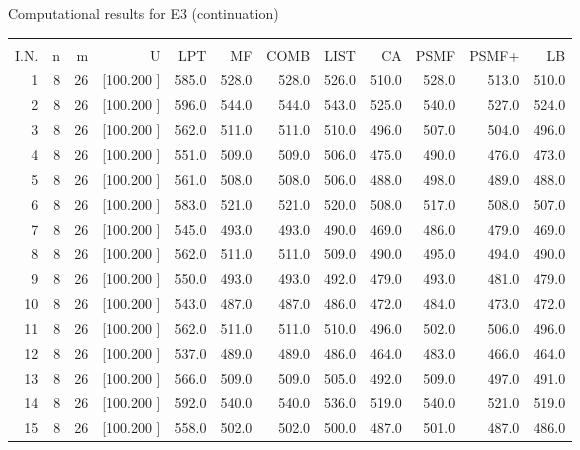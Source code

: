 \documentclass[12pt,a4paper]{article}
\begin{document}
\newpage
\begin{center}
 Computational results for E3 (continuation) {\tiny
\begin{tabular}{r r r r r r r r r r r r}\hline
    &   &   &          &        &        &        &        &        &        &        &       \\[-0.1in]
  I.N.  &  n  &  m  &  U  &  LPT  &  MF  &  COMB  &  LIST  &  CA  & PSMF &PSMF+ & LB \\[0.03in]
\hline
   1&  8& 26&[100.200   ]&   585.0&   528.0&   528.0&   526.0&   510.0&   528.0&   513.0&   510.0\\[-0.02in]
   2&  8& 26&[100.200   ]&   596.0&   544.0&   544.0&   543.0&   525.0&   540.0&   527.0&   524.0\\[-0.02in]
   3&  8& 26&[100.200   ]&   562.0&   511.0&   511.0&   510.0&   496.0&   507.0&   504.0&   496.0\\[-0.02in]
   4&  8& 26&[100.200   ]&   551.0&   509.0&   509.0&   506.0&   475.0&   490.0&   476.0&   473.0\\[-0.02in]
   5&  8& 26&[100.200   ]&   561.0&   508.0&   508.0&   506.0&   488.0&   498.0&   489.0&   488.0\\[-0.02in]
   6&  8& 26&[100.200   ]&   583.0&   521.0&   521.0&   520.0&   508.0&   517.0&   508.0&   507.0\\[-0.02in]
   7&  8& 26&[100.200   ]&   545.0&   493.0&   493.0&   490.0&   469.0&   486.0&   479.0&   469.0\\[-0.02in]
   8&  8& 26&[100.200   ]&   562.0&   511.0&   511.0&   509.0&   490.0&   495.0&   494.0&   490.0\\[-0.02in]
   9&  8& 26&[100.200   ]&   550.0&   493.0&   493.0&   492.0&   479.0&   493.0&   481.0&   479.0\\[-0.02in]
  10&  8& 26&[100.200   ]&   543.0&   487.0&   487.0&   486.0&   472.0&   484.0&   473.0&   472.0\\[-0.02in]
  11&  8& 26&[100.200   ]&   562.0&   511.0&   511.0&   510.0&   496.0&   502.0&   506.0&   496.0\\[-0.02in]
  12&  8& 26&[100.200   ]&   537.0&   489.0&   489.0&   486.0&   464.0&   483.0&   466.0&   464.0\\[-0.02in]
  13&  8& 26&[100.200   ]&   566.0&   509.0&   509.0&   505.0&   492.0&   509.0&   497.0&   491.0\\[-0.02in]
  14&  8& 26&[100.200   ]&   592.0&   540.0&   540.0&   536.0&   519.0&   540.0&   521.0&   519.0\\[-0.02in]
  15&  8& 26&[100.200   ]&   558.0&   502.0&   502.0&   500.0&   487.0&   501.0&   487.0&   486.0\\[-0.02in]

\end{tabular}}
\end{center}
\end{document}
